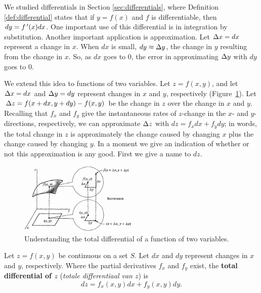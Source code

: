We studied  differentials in Section \ref{sec:differentials}, where Definition \ref{def:differential}  states that if $y=f(x)$ and $f$ is differentiable, then $dy=f\,'(x)dx$. One important use of this differential is in integration by substitution. Another important application is approximation. Let $\Delta x = dx$ represent a change in $x$. When $dx$ is small, $dy\approx \Delta y$, the change in $y$ resulting from the change in $x$. So, as $dx$ goes to 0, the error in approximating $\Delta y$ with $dy$ goes to 0.

We extend this idea to functions of two variables. Let $z=f(x,y)$, and let $\Delta x = dx$ and $\Delta y=dy$ represent changes in $x$ and $y$, respectively (Figure~\ref{fig_multi_var_11}). Let $\Delta z = f(x+dx,y+dy) - f(x,y)$ be the change in $z$ over the change in $x$ and $y$. Recalling that $f_x$ and $f_y$ give the instantaneous rates of $z$-change in the $x$- and $y$-directions, respectively, we can approximate $\Delta z$ with $dz = f_xdx+f_ydy$; in words, the total change in $z$ is approximately the change caused by changing $x$ plus the change caused by changing $y$. In a moment we give an indication of whether or not this approximation is any good. First we give a name to $dz$.



\begin{figure}
	\begin{center}
			\includegraphics[width=0.5\textwidth]{fig_multi_var_11}
	\caption{Understanding the total differential of a function of two variables.}
	\label{fig_multi_var_11}
	\end{center}
\end{figure}

\ifanalysis\pagebreak\fi
\begin{definition}\label{def:total_differential}
Let $z=f(x,y)$ be continuous on a set $S$. Let $dx$ and $dy$ represent changes in $x$ and $y$, respectively. Where the partial derivatives $f_x$ and $f_y$ exist, the \textbf{total differential of $z$} (\textit{totale differentiaal van $z$}) is 
$$dz = f_x(x,y)dx + f_y(x,y)dy.$$
\end{definition}

